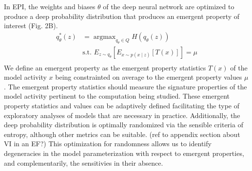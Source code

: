 \documentclass[11pt]{article}
\DeclareMathOperator*{\argmax}{argmax}
\begin{document}
In EPI, the weights and biases $\theta$ of the deep neural network are optimized to produce a deep probability distribution that produces an emergent property of interest (Fig. 2B). 
\begin{equation}
\begin{split}
q_\theta^*(z) &= \argmax_{q_\theta \in Q} H(q_\theta(z)) \\
 &  \text{s.t.  } E_{z \sim q_\theta}\left[ E_{x\sim p(x \mid z)}\left[T(x)\right] \right] = \mu \\
 \end{split}
\end{equation}
We define an emergent property as the emergent property statistics $T(x)$ of the model activity $x$ being constrainted on average to the emergent property values $\mu$ .  The emergent property statistics should measure the signature properties of the model activity pertinent to the computation being studied.  These emergent property statistics and values can be adaptively defined facilitating the type of exploratory analyses of models that are necessary in practice.  Additionally, the deep probability distribution is optimally randomized via the sensible criteria of entropy, although other metrics can be suitable. (ref to appendix section about VI in an EF?) This optimization for randomness allows us to identify degeneracies in the model parameterization with respect to emergent properties, and complementarily, the sensitivies in their absence.
\end{document}
